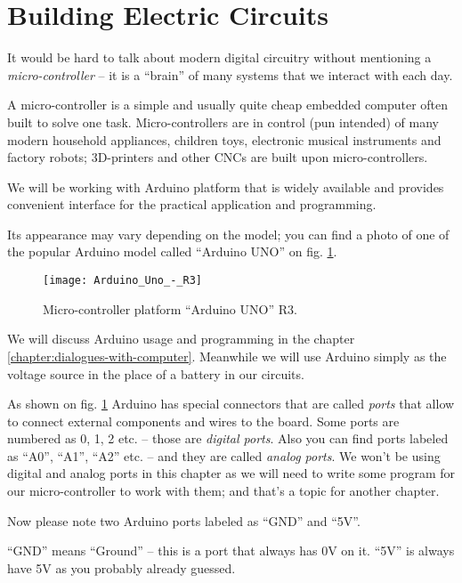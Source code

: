 \documentclass[../sparc.tex]{subfiles}
\begin{document}
\section{Building Electric Circuits}

It would be hard to talk about modern digital circuitry without mentioning a
\emph{micro-controller} -- it is a ``brain'' of many systems that we interact
with each day.

A micro-controller is a simple and usually quite cheap embedded computer often
built to solve one task.  Micro-controllers are in control (pun intended) of
many modern household appliances, children toys, electronic musical instruments
and factory robots; 3D-printers and other CNCs are built upon micro-controllers.

We will be working with Arduino platform that is widely available and provides
convenient interface for the practical application and programming.

Its appearance may vary depending on the model; you can find a photo of one of
the popular Arduino model called ``Arduino UNO'' on
fig. \ref{fig:arduino-uno-r3}.

\begin{figure}[ht]
  \centering
  \texttt{[image: Arduino\_Uno\_-\_R3]}
  \caption{Micro-controller platform ``Arduino UNO'' R3.}
  \label{fig:arduino-uno-r3}
\end{figure}

We will discuss Arduino usage and programming in the chapter
\ref{chapter:dialogues-with-computer}.  Meanwhile we will use Arduino simply as
the voltage source in the place of a battery in our circuits.

As shown on fig. \ref{fig:arduino-uno-r3} Arduino has special connectors that
are called \emph{ports} that allow to connect external components and wires to
the board.  Some ports are numbered as 0, 1, 2 etc. -- those are \emph{digital
ports}.  Also you can find ports labeled as ``A0'', ``A1'', ``A2'' etc. -- and
they are called \emph{analog ports}.  We won't be using digital and analog ports
in this chapter as we will need to write some program for our micro-controller
to work with them; and that's a topic for another chapter.

Now please note two Arduino ports labeled as ``GND'' and ``5V''.

``GND'' means ``Ground'' -- this is a port that always has 0V on it.  ``5V'' is
always have 5V as you probably already guessed.
\end{document}
